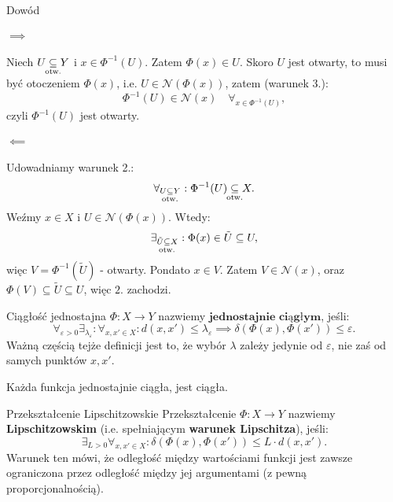 \documentclass{article}
\newcounter{defi}
\numberwithin{defi}{section}
\numberwithin{theo}{section}
\numberwithin{defi}{section}
\newcommand{\eps}{\varepsilon}
\newcommand{\Nau}{\mathcal{N}}
\newcommand{\subotw}{\underset{\clap{\scriptsize otw.}}{\subseteq}}
\begin{document}
    \begin{dow}{Dowód}
        \paragraph{$\implies$} Niech $U \subotw Y$ i $x \in \Phi^{-1}(U)$. Zatem $\Phi(x) \in U$. Skoro $U$ jest otwarty, to musi być otoczeniem $\Phi(x)$, i.e. $U \in \Nau(\Phi(x))$, zatem (warunek 3.): \begin{equation*}
            \Phi^{-1}(U) \in \Nau(x) \quad \forall_{x \in \Phi^{-1}(U)},
        \end{equation*} czyli $\Phi^{-1}(U)$ jest otwarty.

        \paragraph{$\impliedby$} Udowadniamy warunek 2.:\begin{equation*}
            \forall_{U \subotw Y}: \Phi^{-1}(U) \subotw X.
        \end{equation*} Weźmy $x \in X$ i $U \in \Nau(\Phi(x))$. Wtedy: \begin{equation*}
            \exists_{\tilde{U} \subotw X}: \Phi(x) \in \tilde{U} \subseteq U,
        \end{equation*} więc $V = \Phi^{-1}(\tilde{U})$ - otwarty. Pondato $x \in V$. Zatem $V \in \Nau(x)$, oraz $\Phi(V) \subseteq \tilde{U} \subseteq U$, więc $2.$ zachodzi.
    \end{dow}


    \begin{defr} {Ciągłość jednostajna} \label{defr:ciaglosc-jednostajna}
        $\Phi: X \to Y$ nazwiemy $\textbf{jednostajnie ciągłym}$, jeśli: \begin{equation}
            \forall_{\eps > 0} \exists_{\lambda_\eps}: \forall_{x, x' \in X}: d(x, x') \leqslant \lambda_\eps \implies \delta(\Phi(x), \Phi(x')) \leqslant \eps.
        \end{equation}
        Ważną częścią tejże definicji jest to, że wybór $\lambda$ zależy jedynie od $\eps$, nie zaś od samych punktów $x, x'$.
    \end{defr} 

    \begin{obs}{}
        Każda funkcja jednostajnie ciągła, jest ciągła.
    \end{obs}

    \begin{defr}{Przekształcenie Lipschitzowskie}
        Przekształcenie $\Phi: X \to Y$ nazwiemy \textbf{Lipschitzowskim} (i.e. spełniającym \textbf{warunek Lipschitza}), jeśli:\begin{equation}
            \exists_{L > 0} \forall_{x, x' \in X}: \delta(\Phi(x), \Phi(x')) \leqslant L \cdot d(x, x').
        \end{equation} Warunek ten mówi, że odległość między wartościami funkcji jest zawsze ograniczona przez odległość między jej argumentami (z pewną proporcjonalnością).
    \end{defr}
\end{document}

